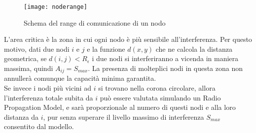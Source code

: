 %
\begin{wrapfigure}{R}{0.5\textwidth}
	\begin{center}
		\texttt{[image: noderange]}
	\end{center}
	\caption{Schema del range di comunicazione di un nodo\label{fig:noderange}}
\end{wrapfigure}
%
L'area critica è la zona in cui ogni nodo è più sensibile all'interferenza. Per questo motivo, dati due nodi $i$ e $j$ e la funzione $d(x,y)$ che ne calcola la distanza geometrica, se $d(i,j) < R_\epsilon $ i due nodi si interferiranno a vicenda in maniera massima, quindi $A_{ij} = S_{max}$.
La presenza di molteplici nodi in questa zona non annullerà comunque la capacità minima garantita. \\
Se invece i nodi più vicini ad $i$ si trovano nella corona circolare, allora l'interferenza totale subita da $i$ può essere valutata simulando un Radio Propagation Model, e sarà proporzionale al numero di questi nodi e alla loro distanza da $i$, pur senza superare il livello massimo di interferenza $S_{max}$ consentito dal modello. 


